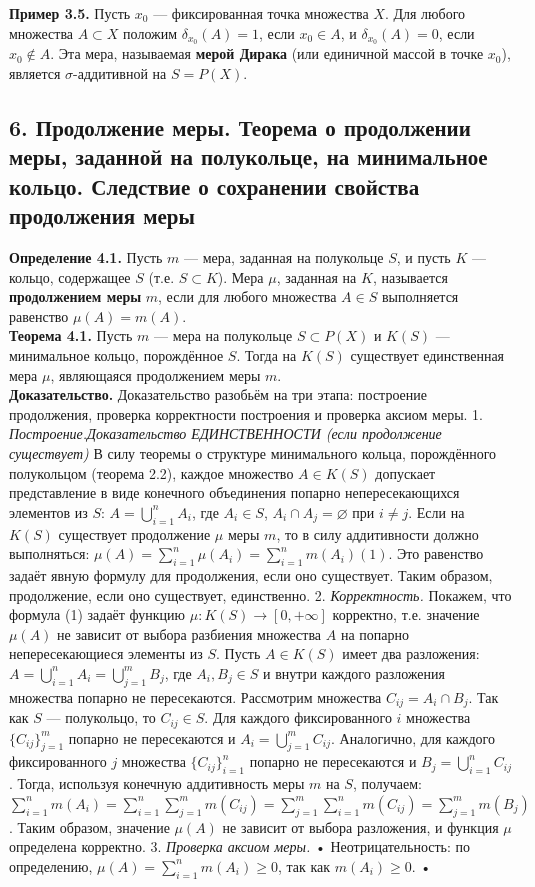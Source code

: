 \documentclass[12pt]{article}
\begin{document}
\textbf{Пример 3.5.} Пусть $x_0$ — фиксированная точка множества $X$. Для любого множества $A \subset X$ положим $\delta_{x_0}(A) = 1$, если $x_0 \in A$, и $\delta_{x_0}(A) = 0$, если $x_0 \notin A$. Эта мера, называемая \textbf{мерой Дирака} (или единичной массой в точке $x_0$), является $\sigma$-аддитивной на $S = P(X)$.

\subsection*{6. Продолжение меры. Теорема о продолжении меры, заданной на полукольце, на
минимальное кольцо. Следствие о сохранении свойства продолжения меры}
\textbf{Определение 4.1.} Пусть $m$ — мера, заданная на полукольце $S$, и пусть $K$ — кольцо, содержащее $S$ (т.е. $S \subset K$). Мера $\mu$, заданная на $K$, называется \textbf{продолжением меры} $m$, если для любого множества $A \in S$ выполняется равенство $\mu(A) = m(A)$. \\\textbf{Теорема 4.1.} Пусть $m$ — мера на полукольце $S \subset P(X)$ и $K(S)$ — минимальное кольцо, порождённое $S$. Тогда на $K(S)$ существует единственная мера $\mu$, являющаяся продолжением меры $m$. \\\textbf{Доказательство.} Доказательство разобьём на три этапа: построение продолжения, проверка корректности построения и проверка аксиом меры. 1. \textit{Построение.Доказательство ЕДИНСТВЕННОСТИ (если продолжение существует)} В силу теоремы о структуре минимального кольца, порождённого полукольцом (теорема 2.2), каждое множество $A \in K(S)$ допускает представление в виде конечного объединения попарно непересекающихся элементов из $S$: $A = \bigcup_{i=1}^{n} A_i$, где $A_i \in S$, $A_i \cap A_j = \varnothing$ при $i \ne j$. Если на $K(S)$ существует продолжение $\mu$ меры $m$, то в силу аддитивности должно выполняться: $\mu(A) = \sum_{i=1}^{n} \mu(A_i) = \sum_{i=1}^{n} m(A_i) (1)$. Это равенство задаёт явную формулу для продолжения, если оно существует. Таким образом, продолжение, если оно существует, единственно. 2. \textit{Корректность.} Покажем, что формула (1) задаёт функцию $\mu : K(S) \to [0, +\infty]$ корректно, т.е. значение $\mu(A)$ не зависит от выбора разбиения множества $A$ на попарно непересекающиеся элементы из $S$. Пусть $A \in K(S)$ имеет два разложения: $A = \bigcup_{i=1}^{n} A_i = \bigcup_{j=1}^{m} B_j$, где $A_i, B_j \in S$ и внутри каждого разложения множества попарно не пересекаются. Рассмотрим множества $C_{ij} = A_i \cap B_j$. Так как $S$ — полукольцо, то $C_{ij} \in S$. Для каждого фиксированного $i$ множества $\{C_{ij}\}_{j=1}^{m}$ попарно не пересекаются и $A_i = \bigcup_{j=1}^{m} C_{ij}$. Аналогично, для каждого фиксированного $j$ множества $\{C_{ij}\}_{i=1}^{n}$ попарно не пересекаются и $B_j = \bigcup_{i=1}^{n} C_{ij}$. Тогда, используя конечную аддитивность меры $m$ на $S$, получаем: $\sum_{i=1}^{n} m(A_i) = \sum_{i=1}^{n} \sum_{j=1}^{m} m(C_{ij}) = \sum_{j=1}^{m} \sum_{i=1}^{n} m(C_{ij}) = \sum_{j=1}^{m} m(B_j)$. Таким образом, значение $\mu(A)$ не зависит от выбора разложения, и функция $\mu$ определена корректно. 3. \textit{Проверка аксиом меры.} • Неотрицательность: по определению, $\mu(A) = \sum_{i=1}^{n} m(A_i) \ge 0$, так как $m(A_i) \ge 0$. • 
\end{document}
